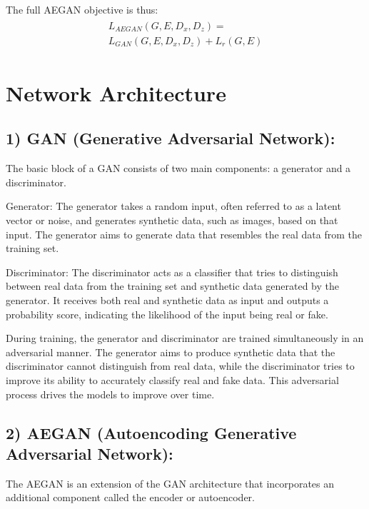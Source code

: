 \documentclass[letterpaper]{article} %
\begin{document}
The full AEGAN objective is thus:
\begin{gather}\label{eq:7}
    \begin{aligned}
     {L}_{AEGAN}(G, E, D_x, D_z) = \\ {L}_{GAN}(G, E, D_x, D_z) + {L}_{r}(G, E) 
    \end{aligned}
\end{gather}



\section{Network Architecture}
\subsection{1) GAN (Generative Adversarial Network):}

The basic block of a GAN consists of two main components: a generator and a discriminator.

Generator: The generator takes a random input, often referred to as a latent vector or noise, and generates synthetic data, such as images, based on that input. The generator aims to generate data that resembles the real data from the training set.

Discriminator: The discriminator acts as a classifier that tries to distinguish between real data from the training set and synthetic data generated by the generator. It receives both real and synthetic data as input and outputs a probability score, indicating the likelihood of the input being real or fake.

During training, the generator and discriminator are trained simultaneously in an adversarial manner. The generator aims to produce synthetic data that the discriminator cannot distinguish from real data, while the discriminator tries to improve its ability to accurately classify real and fake data. This adversarial process drives the models to improve over time.
\subsection{2) AEGAN (Autoencoding Generative Adversarial Network):}
The AEGAN is an extension of the GAN architecture that incorporates an additional component called the encoder or autoencoder\cite{encod}.
\end{document}
